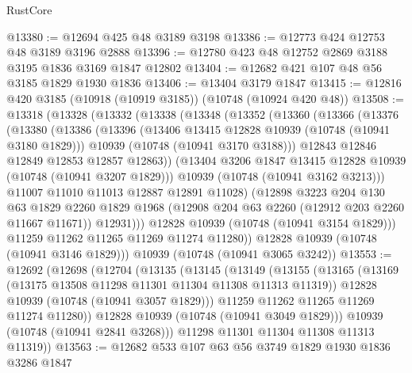\begin{lexlean}{RustCore}
\begin{coremodule}
@13380 := @12694 @425 @48 @3189 @3198
@13386 := @12773 @424 @12753 @48 @3189 @3196 @2888
@13396 := @12780 @423 @48 @12752 @2869 @3188 @3195 @1836 @3169 @1847 @12802
@13404 := @12682 @421 @107 @48 @56 @3185 @1829 @1930 @1836
@13406 := @13404 @3179 @1847
@13415 := @12816 @420 @3185 (@10918 (@10919 @3185)) (@10748 (@10924 @420 @48))
@13508 := @13318
    (@13328
      (@13332
        (@13338
          (@13348
            (@13352
              (@13360
                (@13366
                  (@13376
                    (@13380
                      (@13386
                        (@13396
                          (@13406 @13415 @12828 @10939 (@10748 (@10941 @3180 @1829)))
                          @10939
                          (@10748 (@10941 @3170 @3188)))
                        @12843
                        @12846
                        @12849
                        @12853
                        @12857
                        @12863))
                    (@13404 @3206 @1847 @13415 @12828 @10939 (@10748 (@10941 @3207 @1829)))
                    @10939
                    (@10748 (@10941 @3162 @3213)))
                  @11007
                  @11010
                  @11013
                  @12887
                  @12891
                  @11028)
                (@12898
                  @3223
                  @204
                  @130
                  @63
                  @1829
                  @2260
                  @1829
                  @1968
                  (@12908 @204 @63 @2260 (@12912 @203 @2260 @11667 @11671))
                  @12931)))
            @12828
            @10939
            (@10748 (@10941 @3154 @1829)))
          @11259
          @11262
          @11265
          @11269
          @11274
          @11280))
      @12828
      @10939
      (@10748 (@10941 @3146 @1829)))
    @10939
    (@10748 (@10941 @3065 @3242))
@13553 := @12692
    (@12698
      (@12704
        (@13135
          (@13145
            (@13149
              (@13155
                (@13165
                  (@13169 (@13175 @13508 @11298 @11301 @11304 @11308 @11313 @11319))
                  @12828
                  @10939
                  (@10748 (@10941 @3057 @1829)))
                @11259
                @11262
                @11265
                @11269
                @11274
                @11280))
            @12828
            @10939
            (@10748 (@10941 @3049 @1829)))
          @10939
          (@10748 (@10941 @2841 @3268)))
        @11298
        @11301
        @11304
        @11308
        @11313
        @11319))
@13563 := @12682 @533 @107 @63 @56 @3749 @1829 @1930 @1836 @3286 @1847

\end{coremodule}
\end{lexlean}
